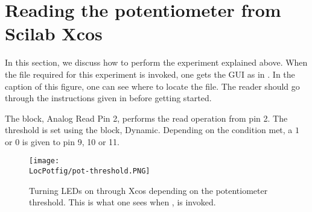 \section{Reading the potentiometer from Scilab Xcos}
In this section, we discuss how to perform the experiment explained above.  When the file required for this experiment is invoked, one gets the GUI as in .  In the caption of this figure, one can see where to locate the file.  The reader should go through the instructions given in  before getting started.

The block, Analog Read Pin 2, performs the read operation from pin 2. The threshold is set using the block, Dynamic. Depending on the condition met, a $1$ or $0$ is given to pin 9, 10 or 11.
\begin{figure}
  \centering
  \texttt{[image: \\LocPotfig/pot-threshold.PNG]}
  \caption[Turning LEDs on through Xcos depending on the potentiometer
  threshold]{Turning LEDs on through Xcos depending on the
    potentiometer threshold.  This is what one sees when
      , is invoked.}
  \label{fig:pot-threshold}
\end{figure}

